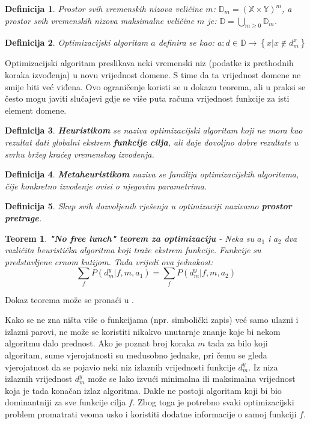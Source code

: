 \documentclass[times, utf8, diplomski, numeric]{fer}
\newtheorem{definition}{Definicija}
\newtheorem{theorem}{Teorem}
\begin{document}
\begin{definition}
Prostor svih vremenskih nizova veličine $m$: $\mathbb{D}_m = (\mathbb{X} \times \mathbb{Y})^m$, a prostor svih vremenskih nizova maksimalne veličine $m$ je: $\mathbb{D} = \bigcup_{m\ge0}\mathbb{D}_m$.
\end{definition}

\begin{definition}
Optimizacijski algoritam $a$ definira se kao: $a : d \in \mathbb{D} \rightarrow \left \{x | x \notin d_m^x \right \}$
\end{definition}

Optimizacijski algoritam preslikava neki vremenski niz (podatke iz prethodnih koraka izvođenja) u novu vrijednost domene. S time da ta vrijednost domene ne smije biti već viđena. Ovo ograničenje koristi se u dokazu teorema, ali u praksi se često mogu javiti slučajevi gdje se više puta računa vrijednost funkcije za isti element domene.

\begin{definition}
\textbf{Heuristikom} se naziva optimizacijski algoritam koji ne mora kao rezultat dati globalni ekstrem \textbf{funkcije cilja}, ali daje dovoljno dobre rezultate u svrhu bržeg kraćeg vremenskog izvođenja. 
\end{definition}

\begin{definition}
\textbf{Metaheuristikom} naziva se familija optimizacijskih algoritama, čije konkretno izvođenje ovisi o njegovim parametrima.
\end{definition}

\begin{definition}
Skup svih dozvoljenih rješenja u optimizaciji nazivamo \textbf{prostor pretrage}.
\end{definition}

\begin{theorem}
\label{thm:nofreelunch}
\textbf{"No free lunch" teorem za optimizaciju} - Neka su $a_1$ i $a_2$ dva različita heuristička algoritma koji traže ekstrem funkcije. Funkcije su predstavljene crnom kutijom. Tada vrijedi ova jednakost:
\begin{equation}
	\sum_{f}P(d_m^y|f,m,a_1) = \sum_{f}P(d_m^y|f,m,a_2)
\end{equation}
\end{theorem}

Dokaz teorema može se pronaći u \cite{lit15}.

Kako se ne zna ništa više o funkcijama (npr. simbolički zapis) već samo ulazni i izlazni parovi, ne može se koristiti nikakvo unutarnje znanje koje bi nekom algoritmu dalo prednost. Ako je poznat broj koraka $m$ tada za bilo koji algoritam, sume vjerojatnosti su međusobno jednake, pri čemu se gleda vjerojatnost da se pojavio neki niz izlaznih vrijednosti funkcije $d_m^y$.
Iz niza izlaznih vrijednost $d_m^y$ može se lako izvući minimalna ili maksimalna vrijednost koja je tada konačan izlaz algoritma. Dakle ne postoji algoritam koji bi bio dominantniji za sve funkcije cilja $f$. Zbog toga je potrebno svaki optimizacijski problem promatrati veoma usko i koristiti dodatne informacije o samoj funkciji $f$.
\end{document}
